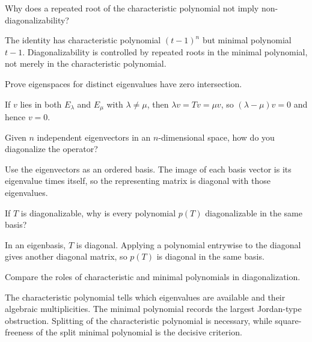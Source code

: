 \begin{problem}\label{prob:i11-problem-08}
Why does a repeated root of the characteristic polynomial not imply non-diagonalizability?
\end{problem}
\begin{solution}
The identity has characteristic polynomial $(t-1)^n$ but minimal polynomial $t-1$. Diagonalizability is controlled by repeated roots in the minimal polynomial, not merely in the characteristic polynomial.
\end{solution}

\begin{problem}\label{prob:i11-problem-09}
Prove eigenspaces for distinct eigenvalues have zero intersection.
\end{problem}
\begin{solution}
If $v$ lies in both $E_\lambda$ and $E_\mu$ with $\lambda\ne\mu$, then $\lambda v=Tv=\mu v$, so $(\lambda-\mu)v=0$ and hence $v=0$.
\end{solution}

\begin{problem}\label{prob:i11-problem-10}
Given $n$ independent eigenvectors in an $n$-dimensional space, how do you diagonalize the operator?
\end{problem}
\begin{solution}
Use the eigenvectors as an ordered basis. The image of each basis vector is its eigenvalue times itself, so the representing matrix is diagonal with those eigenvalues.
\end{solution}

\begin{problem}\label{prob:i11-problem-11}
If $T$ is diagonalizable, why is every polynomial $p(T)$ diagonalizable in the same basis?
\end{problem}
\begin{solution}
In an eigenbasis, $T$ is diagonal. Applying a polynomial entrywise to the diagonal gives another diagonal matrix, so $p(T)$ is diagonal in the same basis.
\end{solution}

\begin{problem}\label{prob:i11-problem-12}
Compare the roles of characteristic and minimal polynomials in diagonalization.
\end{problem}
\begin{solution}
The characteristic polynomial tells which eigenvalues are available and their algebraic multiplicities. The minimal polynomial records the largest Jordan-type obstruction. Splitting of the characteristic polynomial is necessary, while square-freeness of the split minimal polynomial is the decisive criterion.
\end{solution}

